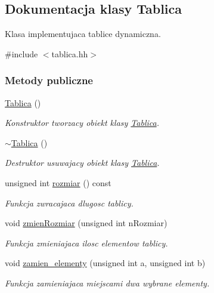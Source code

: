 \hypertarget{class_tablica}{\subsection{Dokumentacja klasy Tablica}
\label{class_tablica}
}


Klasa implementujaca tablice dynamiczna.  




{\ttfamily \#include $<$tablica.\-hh$>$}

\subsubsection*{Metody publiczne}
\begin{DoxyCompactItemize}
\item 
\hyperlink{class_tablica_a5f484e7b0478e1ff9b62e894f9d7b28d}{Tablica} ()
\begin{DoxyCompactList}\small\item\em Konstruktor tworzacy obiekt klasy \hyperlink{class_tablica}{Tablica}. \end{DoxyCompactList}\item 
\hyperlink{class_tablica_a6e1e50608ad0f9f9626d0b1fb698b180}{$\sim$\-Tablica} ()
\begin{DoxyCompactList}\small\item\em Destruktor usuwajacy obiekt klasy \hyperlink{class_tablica}{Tablica}. \end{DoxyCompactList}\item 
unsigned int \hyperlink{class_tablica_ae95a62ea4245e732b96c110c0fc53532}{rozmiar} () const 
\begin{DoxyCompactList}\small\item\em Funkcja zwracajaca dlugosc tablicy. \end{DoxyCompactList}\item 
void \hyperlink{class_tablica_a4bf4f43344da14713c1e4cdccac1b02a}{zmien\-Rozmiar} (unsigned int n\-Rozmiar)
\begin{DoxyCompactList}\small\item\em Funkcja zmieniajaca ilosc elementow tablicy. \end{DoxyCompactList}\item 
void \hyperlink{class_tablica_a33a69de1df812576c5297f4c99378e23}{zamien\-\_\-elementy} (unsigned int a, unsigned int b)
\begin{DoxyCompactList}\small\item\em Funkcja zamieniajaca miejscami dwa wybrane elementy. \end{DoxyCompactList}\item 

\end{DoxyCompactItemize}
